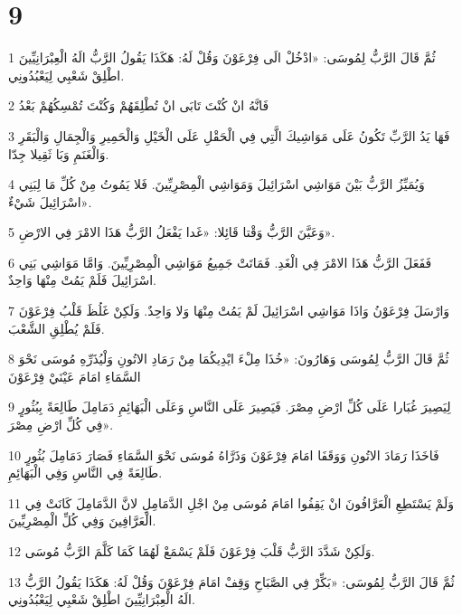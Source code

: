 \chapter{9}

\par 1 ثُمَّ قَالَ الرَّبُّ لِمُوسَى: «ادْخُلْ الَى فِرْعَوْنَ وَقُلْ لَهُ: هَكَذَا يَقُولُ الرَّبُّ الَهُ الْعِبْرَانِيِّينَ اطْلِقْ شَعْبِي لِيَعْبُدُونِي.
\par 2 فَانَّهُ انْ كُنْتَ تَابَى انْ تُطْلِقَهُمْ وَكُنْتَ تُمْسِكُهُمْ بَعْدُ
\par 3 فَهَا يَدُ الرَّبِّ تَكُونُ عَلَى مَوَاشِيكَ الَّتِي فِي الْحَقْلِ عَلَى الْخَيْلِ وَالْحَمِيرِ وَالْجِمَالِ وَالْبَقَرِ وَالْغَنَمِ وَبَا ثَقِيلا جِدّا.
\par 4 وَيُمَيِّزُ الرَّبُّ بَيْنَ مَوَاشِي اسْرَائِيلَ وَمَوَاشِي الْمِصْرِيِّينَ. فَلا يَمُوتُ مِنْ كُلِّ مَا لِبَنِي اسْرَائِيلَ شَيْءٌ».
\par 5 وَعَيَّنَ الرَّبُّ وَقْتا قَائِلا: «غَدا يَفْعَلُ الرَّبُّ هَذَا الامْرَ فِي الارْضِ».
\par 6 فَفَعَلَ الرَّبُّ هَذَا الامْرَ فِي الْغَدِ. فَمَاتَتْ جَمِيعُ مَوَاشِي الْمِصْرِيِّينَ. وَامَّا مَوَاشِي بَنِي اسْرَائِيلَ فَلَمْ يَمُتْ مِنْهَا وَاحِدٌ.
\par 7 وَارْسَلَ فِرْعَوْنُ وَاذَا مَوَاشِي اسْرَائِيلَ لَمْ يَمُتْ مِنْهَا وَلا وَاحِدٌ. وَلَكِنْ غَلُظَ قَلْبُ فِرْعَوْنَ فَلَمْ يُطْلِقِ الشَّعْبَ.
\par 8 ثُمَّ قَالَ الرَّبُّ لِمُوسَى وَهَارُونَ: «خُذَا مِلْءَ ايْدِيكُمَا مِنْ رَمَادِ الاتُونِ وَلْيُذَرِّهِ مُوسَى نَحْوَ السَّمَاءِ امَامَ عَيْنَيْ فِرْعَوْنَ
\par 9 لِيَصِيرَ غُبَارا عَلَى كُلِّ ارْضِ مِصْرَ. فَيَصِيرَ عَلَى النَّاسِ وَعَلَى الْبَهَائِمِ دَمَامِلَ طَالِعَةً بِبُثُورٍ فِي كُلِّ ارْضِ مِصْرَ».
\par 10 فَاخَذَا رَمَادَ الاتُونِ وَوَقَفَا امَامَ فِرْعَوْنَ وَذَرَّاهُ مُوسَى نَحْوَ السَّمَاءِ فَصَارَ دَمَامِلَ بُثُورٍ طَالِعَةً فِي النَّاسِ وَفِي الْبَهَائِمِ.
\par 11 وَلَمْ يَسْتَطِعِ الْعَرَّافُونَ انْ يَقِفُوا امَامَ مُوسَى مِنْ اجْلِ الدَّمَامِلِ لانَّ الدَّمَامِلَ كَانَتْ فِي الْعَرَّافِينَ وَفِي كُلِّ الْمِصْرِيِّينَ.
\par 12 وَلَكِنْ شَدَّدَ الرَّبُّ قَلْبَ فِرْعَوْنَ فَلَمْ يَسْمَعْ لَهُمَا كَمَا كَلَّمَ الرَّبُّ مُوسَى.
\par 13 ثُمَّ قَالَ الرَّبُّ لِمُوسَى: «بَكِّرْ فِي الصَّبَاحِ وَقِفْ امَامَ فِرْعَوْنَ وَقُلْ لَهُ: هَكَذَا يَقُولُ الرَّبُّ الَهُ الْعِبْرَانِيِّينَ اطْلِقْ شَعْبِي لِيَعْبُدُونِي.
